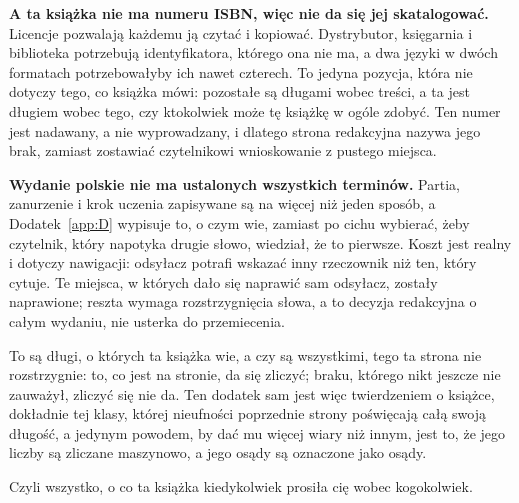 \medskip
\textbf{A ta książka nie ma numeru ISBN, więc nie da się jej skatalogować.}
Licencje pozwalają każdemu ją czytać i kopiować. Dystrybutor, księgarnia i
biblioteka potrzebują identyfikatora, którego ona nie ma, a dwa języki w
dwóch formatach potrzebowałyby ich nawet czterech. To jedyna pozycja, która
nie dotyczy tego, co książka mówi: pozostałe są długami wobec treści, a ta
jest długiem wobec tego, czy ktokolwiek może tę książkę w ogóle zdobyć. Ten
numer jest nadawany, a nie wyprowadzany, i dlatego strona redakcyjna nazywa
jego brak, zamiast zostawiać czytelnikowi wnioskowanie z pustego miejsca.

\medskip
\textbf{Wydanie polskie nie ma ustalonych wszystkich terminów.} Partia,
zanurzenie i krok uczenia zapisywane są na więcej niż jeden sposób, a
Dodatek~\ref{app:D} wypisuje to, o czym wie, zamiast po cichu wybierać, żeby
czytelnik, który napotyka drugie słowo, wiedział, że to pierwsze. Koszt jest
realny i dotyczy nawigacji: odsyłacz potrafi wskazać inny rzeczownik niż ten,
który cytuje. Te miejsca, w których dało się naprawić sam odsyłacz, zostały
naprawione; reszta wymaga rozstrzygnięcia słowa, a to decyzja redakcyjna o
całym wydaniu, nie usterka do przemiecenia.

\medskip
To są długi, o których ta książka wie, a czy są wszystkimi, tego ta strona
nie rozstrzygnie: to, co jest na stronie, da się zliczyć; braku, którego nikt
jeszcze nie zauważył, zliczyć się nie da. Ten dodatek sam jest więc
twierdzeniem o książce, dokładnie tej klasy, której nieufności poprzednie
strony poświęcają całą swoją długość, a jedynym powodem, by dać mu więcej
wiary niż innym, jest to, że jego liczby są zliczane maszynowo, a jego osądy
są oznaczone jako osądy.

Czyli wszystko, o co ta książka kiedykolwiek prosiła cię wobec kogokolwiek.

